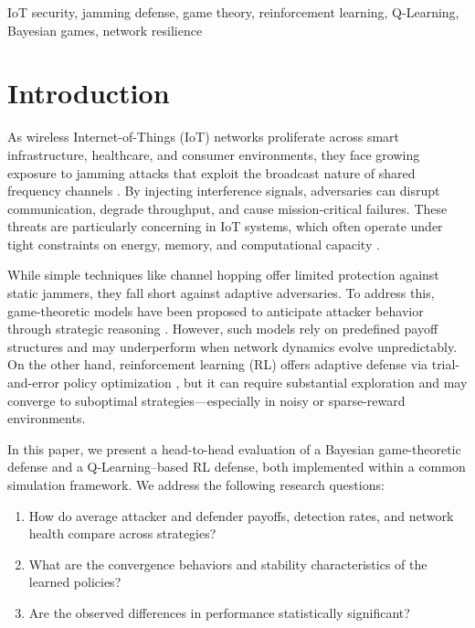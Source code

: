 \documentclass[conference]{IEEEtran}
\begin{document}
\begin{IEEEkeywords}
IoT security, jamming defense, game theory, reinforcement learning, Q-Learning, Bayesian games, network resilience
\end{IEEEkeywords}

\section{Introduction}

As wireless Internet-of-Things (IoT) networks proliferate across smart infrastructure, healthcare, and consumer environments, they face growing exposure to jamming attacks that exploit the broadcast nature of shared frequency channels \cite{survey2022jamming}. By injecting interference signals, adversaries can disrupt communication, degrade throughput, and cause mission-critical failures. These threats are particularly concerning in IoT systems, which often operate under tight constraints on energy, memory, and computational capacity \cite{singh2023bayesian}.

While simple techniques like channel hopping offer limited protection against static jammers, they fall short against adaptive adversaries. To address this, game-theoretic models have been proposed to anticipate attacker behavior through strategic reasoning \cite{jia2022game}. However, such models rely on predefined payoff structures and may underperform when network dynamics evolve unpredictably. On the other hand, reinforcement learning (RL) offers adaptive defense via trial-and-error policy optimization \cite{tang2024adaptive}, but it can require substantial exploration and may converge to suboptimal strategies—especially in noisy or sparse-reward environments.

In this paper, we present a head-to-head evaluation of a Bayesian game-theoretic defense and a Q-Learning–based RL defense, both implemented within a common simulation framework. We address the following research questions:
\begin{enumerate}
  \item How do average attacker and defender payoffs, detection rates, and network health compare across strategies?  
  \item What are the convergence behaviors and stability characteristics of the learned policies?  
  \item Are the observed differences in performance statistically significant?  
\end{enumerate}
\end{document}

